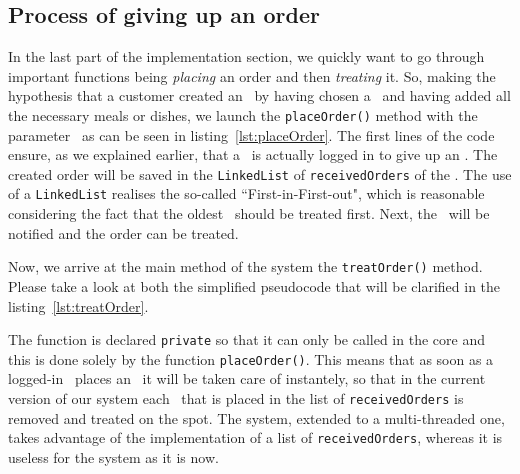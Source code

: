 

\subsection{Process of giving up an order} %
\label{ssub:process_of_giving_up_an_order}

In the last part of the implementation section, we quickly want to go through
important functions being \emph{placing} an order and then \emph{treating} it. 
So, making the hypothesis that a customer created an \Order~by having chosen a
\Restaurant~and having added all the necessary meals or dishes,
we launch the \lstinline|placeOrder()| method with the parameter \Order~as can be
seen in listing~\ref{lst:placeOrder}. 
The first lines of the code ensure, as we explained earlier, that a \Customer~is
actually logged in to give up an \Order. The created order will be saved in the
\lstinline|LinkedList| of \lstinline|receivedOrders| of the \Core. The use of a
\lstinline|LinkedList| realises the so-called ``First-in-First-out",
which is reasonable considering the fact that the oldest \Order~should be treated first.
Next, the \Customer~will be notified and the order can be treated.

Now, we arrive at the main method of the system the \lstinline|treatOrder()| method.
Please take a look at both the simplified pseudocode that will be
clarified in the listing~\ref{lst:treatOrder}.

The function is declared \lstinline|private| so that it can only be
called in the core and this is done solely by the function \lstinline|placeOrder()|.
This means that as soon as a logged-in \Customer~places an \Order~it will be taken
care of instantely, so that in the current version of our system each \Order~that is
placed in the list of \lstinline|receivedOrders| is removed and treated on the spot.
The system, extended to a multi-threaded one, takes advantage of the implementation of
a list of \lstinline|receivedOrders|, whereas it is useless for the system as it is now. 

